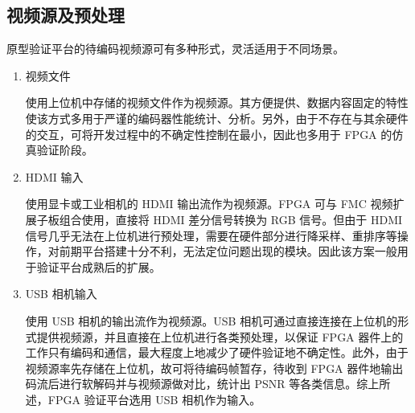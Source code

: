 \subsection{视频源及预处理}
原型验证平台的待编码视频源可有多种形式，灵活适用于不同场景。
\begin{enumerate}
    \item 视频文件

          使用上位机中存储的视频文件作为视频源。其方便提供、数据内容固定的特性使该方式多用于严谨的编码器性能统计、分析。另外，由于不存在与其余硬件的交互，可将开发过程中的不确定性控制在最小，因此也多用于 FPGA 的仿真验证阶段。

    \item HDMI 输入

          使用显卡或工业相机的 HDMI 输出流作为视频源。FPGA 可与 FMC 视频扩展子板组合使用，直接将 HDMI 差分信号转换为 RGB 信号。但由于 HDMI 信号几乎无法在上位机进行预处理，需要在硬件部分进行降采样、重排序等操作，对前期平台搭建十分不利，无法定位问题出现的模块。因此该方案一般用于验证平台成熟后的扩展。

    \item USB 相机输入

          使用 USB 相机的输出流作为视频源。USB 相机可通过直接连接在上位机的形式提供视频源，并且直接在上位机进行各类预处理，以保证 FPGA 器件上的工作只有编码和通信，最大程度上地减少了硬件验证地不确定性。此外，由于视频源率先存储在上位机，故可将待编码帧暂存，待收到 FPGA 器件地输出码流后进行软解码并与视频源做对比，统计出 PSNR 等各类信息。综上所述，FPGA 验证平台选用 USB 相机作为输入。
\end{enumerate}


